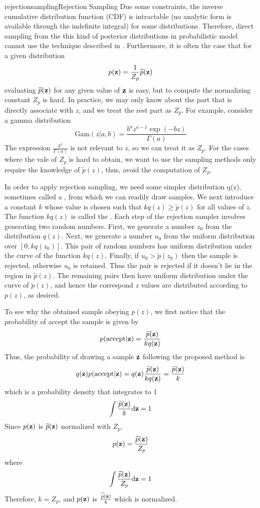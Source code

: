 \documentclass[9pt]{article}
\begin{document}
\begin{topic}{rejectionsampling}{Rejection Sampling}
Due some constraints, the inverse cumulative distribution function (CDF) is intractable (no analytic form is available through the indefinite integral) for some distributions. Therefore, direct sampling from the this kind of posterior distributions in probabilistic model cannot use the technique described in . Furthermore, it is often the case that for a given distribution 
\[
p(\mathbf{z}) = \frac{1}{Z_p}\widetilde{p}(\mathbf{z})
\]
evaluating $\widetilde{p}(\mathbf{z})$ for any given value of $\mathbf{z}$ is easy, but to compute the normalizing constant $Z_p$ is hard. In practice, we may only know about the part that is directly associate with $z$, and we treat the rest part as $Z_p$. For example, consider a gamma distribution
\[
\text{Gam}(z|a,b) = \frac{b^a z^{a-1} \exp(-bz)}{\Gamma(a)}
\]
The expression $\frac{b^a}{\Gamma(a)}$ is not relevant to $z$, so we can treat it as $Z_p$. For the cases where the vale of $Z_p$
 is hard to obtain, we want to use the sampling methods only require the knowledge of $\widetilde{p}(z)$, thus, avoid the computation of $Z_p$.
 
In order to apply rejection sampling, we need some simpler distribution q(z), sometimes called a , from which we can readily draw samples. We next introduce a constant $k$ whose value is chosen such that $kq(z)\geq \widetilde{p}(z)$ for all values of $z$. The function $kq(z)$ is called the . Each step of the rejection sampler involves generating two random numbers. First, we generate a number $z_0$ from the distribution $q(z)$. Next, we generate a number $u_0$ from the uniform distribution over $[0,kq(z_0)]$. This pair of random numbers has uniform distribution under the curve of the function $kq(z)$. Finally, if $u_0 > \widetilde{p}(z_0)$ then the sample is rejected, otherwise $u_0$ is retained. Thus the pair is rejected if it doesn't lie in the region in $\widetilde{p}(z)$. The remaining pairs then have uniform distribution under the curve of $\widetilde{p}(z)$, and hence the correspond $z$ values are distributed according to $p(z)$, as desired. 

To see why the obtained sample obeying $p(z)$, we first notice that the probability of accept the sample is given by
\begin{equation}
\label{eq:rejectionaccept}
p(\text{accept}|\mathbf{z}) = \frac{\widetilde{p}(\mathbf{z})}{kq(\mathbf{z})}
\end{equation}
Thus, the probability of drawing a sample $\mathbf{z}$ following the proposed method is
\[
q(\mathbf{z}) p(\text{accept}|\mathbf{z}) = q(\mathbf{z}) \frac{\widetilde{p}(\mathbf{z})}{kq(\mathbf{z})} = \frac{\widetilde{p}(\mathbf{z})}{k}
\]
which is a probability density that integrates to 1
\[
\int \frac{\widetilde{p}(\mathbf{z})}{k} \mathrm{d} \mathbf{z} = 1
\]
Since $p(\mathbf{z})$ is $\widetilde{p}(\mathbf{z})$ normalized with $Z_p$,
\[
p(\mathbf{z}) = \frac{\widetilde{p}(\mathbf{z})}{Z_p}
\]
where
\[
\int \frac{\widetilde{p}(\mathbf{z})}{Z_p} \mathrm{d} \mathbf{z} = 1
\]
Therefore, $k = Z_p$, and $p(\mathbf{z})$ is $\frac{\widetilde{p}(\mathbf{z})}{k}$ which is normalized.


\end{topic}
\end{document}
